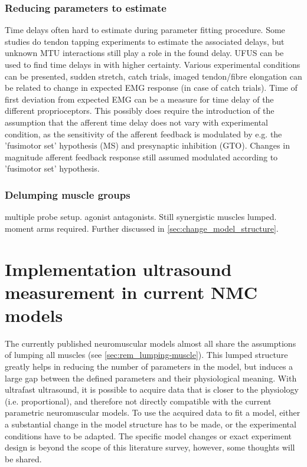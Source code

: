 \subsubsection{Reducing parameters to estimate}
Time delays often hard to estimate during parameter fitting procedure. Some studies do tendon tapping experiments to estimate the associated delays, but unknown MTU interactions still play a role in the found delay. UFUS can be used to find time delays in with higher certainty. Various experimental conditions can be presented, sudden stretch, catch trials, imaged tendon/fibre elongation can be related to change in expected EMG response (in case of catch trials). Time of first deviation from expected EMG can be a measure for time delay of the different proprioceptors. This possibly does require the introduction of the assumption that the afferent time delay does not vary with experimental condition, as the sensitivity of the afferent feedback is modulated by e.g. the 'fusimotor set' hypothesis (MS) and presynaptic inhibition (GTO). Changes in magnitude afferent feedback response still assumed modulated according to 'fusimotor set' hypothesis. 



\subsubsection{Delumping muscle groups}
multiple probe setup. agonist antagonists. 
Still synergistic muscles lumped. 
moment arms required. 
Further discussed in \autoref{sec:change_model_structure}.



\section{Implementation ultrasound measurement in current NMC models}
\label{sec:rem_incompatibility}
The currently published neuromuscular models almost all share the assumptions of lumping all muscles (see \autoref{sec:rem_lumping-muscle}). This lumped structure greatly helps in reducing the number of parameters in the model, but induces a large gap between the defined parameters and their physiological meaning. With ultrafast ultrasound, it is possible to acquire data that is closer to the physiology (i.e. proportional), and therefore not directly compatible with the current parametric neuromuscular models. To use the acquired data to fit a model, either a substantial change in the model structure has to be made, or the experimental conditions have to be adapted. The specific model changes or exact experiment design is beyond the scope of this literature survey, however, some thoughts will be shared.

